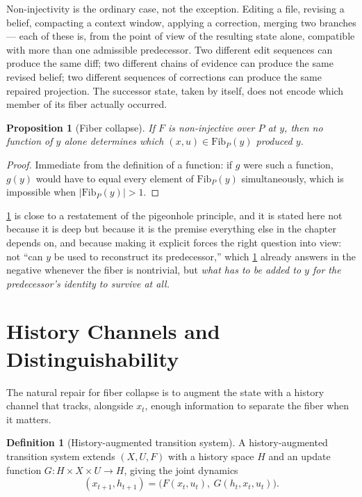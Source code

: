 \documentclass[11pt]{book}
\theoremstyle{plain}
\newtheorem{proposition}[theorem]{Proposition}
\theoremstyle{definition}
\newtheorem{definition}[theorem]{Definition}
\theoremstyle{remark}
\begin{document}
Non-injectivity is the ordinary case, not the exception. Editing a
file, revising a belief, compacting a context window, applying a
correction, merging two branches --- each of these is, from the point
of view of the resulting state alone, compatible with more than one
admissible predecessor. Two different edit sequences can produce the
same diff; two different chains of evidence can produce the same
revised belief; two different sequences of corrections can produce the
same repaired projection. The successor state, taken by itself, does
not encode which member of its fiber actually occurred.

\begin{proposition}[Fiber collapse]
\label{prop:fiber-collapse}
If $F$ is non-injective over $P$ at $y$, then no function of $y$ alone
determines which $(x, u) \in \mathrm{Fib}_P(y)$ produced $y$.
\end{proposition}

\begin{proof}
Immediate from the definition of a function: if $g$ were such a
function, $g(y)$ would have to equal every element of
$\mathrm{Fib}_P(y)$ simultaneously, which is impossible when
$|\mathrm{Fib}_P(y)| > 1$.
\end{proof}

\cref{prop:fiber-collapse} is close to a restatement of the pigeonhole
principle, and it is stated here not because it is deep but because it
is the premise everything else in the chapter depends on, and because
making it explicit forces the right question into view: not
\enquote{can $y$ be used to reconstruct its predecessor,} which
\cref{prop:fiber-collapse} already answers in the negative whenever the
fiber is nontrivial, but \emph{what has to be added to $y$ for the
predecessor's identity to survive at all.}

\section{History Channels and Distinguishability}

The natural repair for fiber collapse is to augment the state with a
history channel that tracks, alongside $x_t$, enough information to
separate the fiber when it matters.

\begin{definition}[History-augmented transition system]
\label{def:augmented-system}
A history-augmented transition system extends $(X, U, F)$ with a
history space $H$ and an update function $G : H \times X \times U \to
H$, giving the joint dynamics
\[
(x_{t+1}, h_{t+1}) = \bigl( F(x_t, u_t),\ G(h_t, x_t, u_t) \bigr).
\]
\end{definition}
\end{document}
